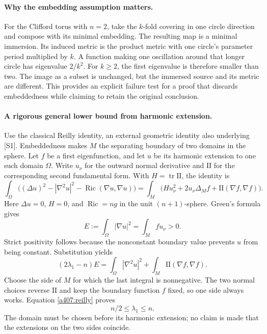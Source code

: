 \documentclass[11pt]{article}
\begin{document}
\paragraph{Why the embedding assumption matters.}
For the Clifford torus with $n=2$, take the $k$-fold covering
in one circle direction and compose with its minimal embedding.
The resulting map is a minimal immersion. Its induced metric
is the product metric with one circle's parameter period
multiplied by $k$. A function making one oscillation around
that longer circle has eigenvalue $2/k^2$. For $k\geq2$,
the first eigenvalue is therefore smaller than two.
The image as a subset is unchanged, but the immersed source
and its metric are different. This provides an explicit
failure test for a proof that discards embeddedness while
claiming to retain the original conclusion.

\paragraph{A rigorous general lower bound from harmonic extension.}
Use the classical Reilly identity, an external geometric identity
also underlying [S1]. Embeddedness makes $M$ the separating
boundary of two domains in the sphere. Let $f$ be a first
eigenfunction, and let $u$ be its harmonic extension to one
such domain $\Omega$. Write $u_\nu$ for the outward normal
derivative and $\mathrm{II}$ for the corresponding second
fundamental form. With $H=\operatorname{tr}\mathrm{II}$,
the identity is
\[
 \int_\Omega\bigl((\Delta u)^2-|\nabla^2u|^2
                  -\operatorname{Ric}(\nabla u,\nabla u)\bigr)
 =\int_M\bigl(Hu_\nu^2+2u_\nu\Delta_Mf
                         +\mathrm{II}(\nabla f,\nabla f)\bigr).
\]
Here $\Delta u=0$, $H=0$, and $\operatorname{Ric}=ng$ in the
unit $(n+1)$-sphere. Green's formula gives
\[
 E:=\int_\Omega|\nabla u|^2=\int_Mfu_\nu>0.
\]
Strict positivity follows because the nonconstant boundary value
prevents $u$ from being constant. Substitution yields
\begin{equation}\label{a407:reilly}
 (2\lambda_1-n)E
 =\int_\Omega|\nabla^2u|^2+
                    \int_M\mathrm{II}(\nabla f,\nabla f).
\end{equation}
Choose the side of $M$ for which the last integral is
nonnegative. The two normal choices reverse $\mathrm{II}$
and keep the boundary function $f$ fixed, so one side always
works. Equation \eqref{a407:reilly} proves
\[
                            n/2\leq\lambda_1\leq n.
\]
The domain must be chosen before its harmonic extension; no
claim is made that the extensions on the two sides coincide.
\end{document}
